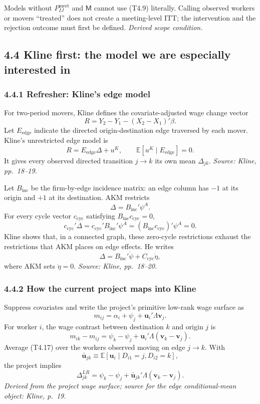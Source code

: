 \documentclass[11pt]{article}
\begin{document}
Models without \(P^{\mathrm{meet}}_{IJ}\) and \(\mathsf M\) cannot use
(T4.9) literally.  Calling observed workers or movers ``treated'' does not
create a meeting-level ITT; the intervention and the rejection outcome must
first be defined.
\textit{Derived scope condition.}

\subsection{4.4 Kline first: the model we are especially interested in}

\subsubsection{4.4.1 Refresher: Kline's edge model}

For two-period movers, Kline defines the covariate-adjusted wage change vector
\[
R
=
Y_2-Y_1-(X_2-X_1)'\beta.
\tag{T4.11}
\]
Let \(E_{\mathrm{edge}}\) indicate the directed origin-destination edge
traversed by each mover.  Kline's unrestricted edge model is
\[
R=E_{\mathrm{edge}}\Delta+u^K,
\qquad
\mathbb E[u^K\mid E_{\mathrm{edge}}]=0.
\tag{T4.12}
\]
It gives every observed directed transition \(j\to k\) its own mean
\(\Delta_{jk}\).
\textit{Source: Kline, pp.\ 18--19.}

Let \(B_{\mathrm{inc}}\) be the firm-by-edge incidence matrix: an edge column
has \(-1\) at its origin and \(+1\) at its destination.  AKM restricts
\[
\Delta=B_{\mathrm{inc}}'\psi^A.
\tag{T4.13}
\]
For every cycle vector \(c_{\mathrm{cyc}}\) satisfying
\(B_{\mathrm{inc}}c_{\mathrm{cyc}}=0\),
\[
c_{\mathrm{cyc}}'\Delta
=
c_{\mathrm{cyc}}'B_{\mathrm{inc}}'\psi^A
=
(B_{\mathrm{inc}}c_{\mathrm{cyc}})'\psi^A
=0.
\tag{T4.14}
\]
Kline shows that, in a connected graph, these zero-cycle restrictions exhaust
the restrictions that AKM places on edge effects.  He writes
\[
\Delta
=
B_{\mathrm{inc}}'\dot\psi
+C_{\mathrm{cyc}}\dot\eta,
\tag{T4.15}
\]
where AKM sets \(\dot\eta=0\).
\textit{Source: Kline, pp.\ 18--20.}

\subsubsection{4.4.2 How the current project maps into Kline}

Suppress covariates and write the project's primitive low-rank wage surface as
\[
m_{ij}
=
\alpha_i+\psi_j+\mathbf u_i'\Lambda\mathbf v_j.
\tag{T4.16}
\]
For worker \(i\), the wage contrast between destination \(k\) and origin \(j\)
is
\[
m_{ik}-m_{ij}
=
\psi_k-\psi_j
+\mathbf u_i'\Lambda(\mathbf v_k-\mathbf v_j).
\tag{T4.17}
\]
Average (T4.17) over the workers observed moving on edge \(j\to k\).  With
\[
\bar{\mathbf u}_{jk}
\equiv
\mathbb E[
\mathbf u_i\mid D_{i1}=j,D_{i2}=k
],
\tag{T4.18}
\]
the project implies
\[
\Delta_{jk}^{LR}
=
\psi_k-\psi_j
+\bar{\mathbf u}_{jk}'\Lambda
(\mathbf v_k-\mathbf v_j).
\tag{T4.19}
\]
\textit{Derived from the project wage surface; source for the edge
conditional-mean object: Kline, p.\ 19.}
\end{document}
